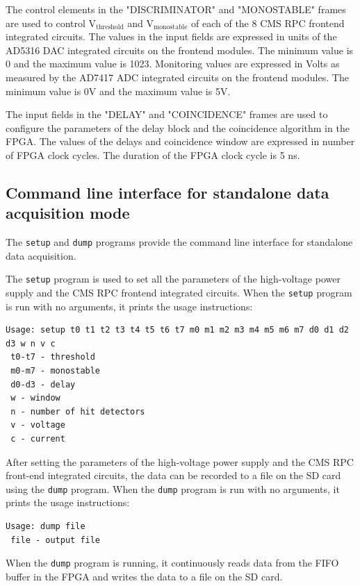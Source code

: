 \documentclass[12pt, a4paper]{article}
\begin{document}
The control elements in the "DISCRIMINATOR" and "MONOSTABLE" frames are used to control $\text{V}_\text{threshold}$ and $\text{V}_\text{monostable}$ of each of the 8 CMS RPC frontend integrated circuits. The values in the input fields are expressed in units of the AD5316 DAC integrated circuits on the frontend modules. The minimum value is 0 and the maximum value is 1023. Monitoring values are expressed in Volts as measured by the AD7417 ADC integrated circuits on the frontend modules. The minimum value is 0V and the maximum value is 5V.

The input fields in the "DELAY" and "COINCIDENCE" frames are used to configure the parameters of the delay block and the coincidence algorithm in the FPGA. The values of the delays and coincidence window are expressed in number of FPGA clock cycles. The duration of the FPGA clock cycle is 5 ns.

\subsection{Command line interface for standalone data acquisition mode}

The \texttt{setup} and \texttt{dump} programs provide the command line interface for standalone data acquisition.

The \texttt{setup} program is used to set all the parameters of the high-voltage power supply and the CMS RPC frontend integrated circuits. When the \texttt{setup} program is run with no arguments, it prints the usage instructions:
\vspace{-1ex}
\begin{verbatim}
Usage: setup t0 t1 t2 t3 t4 t5 t6 t7 m0 m1 m2 m3 m4 m5 m6 m7 d0 d1 d2 d3 w n v c
 t0-t7 - threshold
 m0-m7 - monostable
 d0-d3 - delay
 w - window
 n - number of hit detectors
 v - voltage
 c - current
\end{verbatim}

After setting the parameters of the high-voltage power supply and the CMS RPC front-end integrated circuits, the data can be recorded to a file on the SD card using the \texttt{dump} program. When the \texttt{dump} program is run with no arguments, it prints the usage instructions:
\vspace{-1ex}
\begin{verbatim}
Usage: dump file
 file - output file
\end{verbatim}

When the \texttt{dump} program is running, it continuously reads data from the FIFO buffer in the FPGA and writes the data to a file on the SD card.
\end{document}
